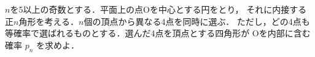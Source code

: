 ﻿\documentclass[../../../uem_mat_tok_q.tex]{subfiles}
\begin{document}
    $n$を5以上の奇数とする．平面上の点Oを中心とする円をとり，%
    それに内接する正$n$角形を考える．$n$個の頂点から異なる4点を同時に選ぶ．%
    ただし，どの4点も等確率で選ばれるものとする．選んだ4点を頂点とする四角形が%
    Oを内部に含む確率 $p_n$ を求めよ．
\end{document}
